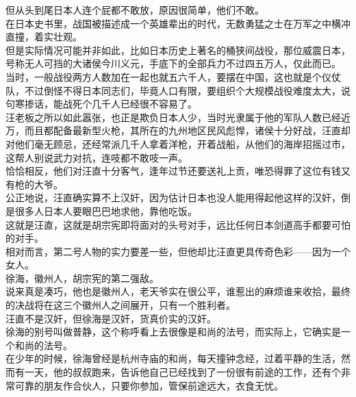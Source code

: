 \begin{multicols}{\theparacolNo}
但从头到尾日本人连个屁都不敢放，原因很简单，他们不敢。\\

在日本史书里，战国被描述成一个英雄辈出的时代，无数勇猛之士在万军之中横冲直撞，着实壮观。\\

但是实际情况可能并非如此，比如日本历史上著名的桶狭间战役，那位威震日本，号称无人可挡的大诸侯今川义元，手底下的全部兵力不过四五万人，仅此而已。\\

当时，一般战役两方人数加在一起也就五六千人，要摆在中国，这也就是个仪仗队，不过倒怪不得日本同志们，毕竟人口有限，要组织个大规模战役难度太大，说句寒掺话，能战死个几千人已经很不容易了。\\

汪老板之所以如此嚣张，也正是欺负日本人少，当时光隶属于他的军队人数已经近万，而且都配备最新型火枪，其所在的九州地区民风彪悍，诸侯十分好战，汪直却对他们毫无顾忌，还经常派几千人拿着洋枪，开着战船，从他们的海岸招摇过市，这帮人别说武力对抗，连吱都不敢吱一声。\\

恰恰相反，他们对汪直十分客气，逢年过节还要送礼上贡，唯恐得罪了这位有钱又有枪的大爷。\\

公正地说，汪直确实算不上汉奸，因为估计日本也没人能用得起他这样的汉奸，倒是很多人日本人要眼巴巴地求他，靠他吃饭。\\

这就是汪直，这就是胡宗宪即将面对的头号对手，远比任何日本剑道高手都要可怕的对手。\\

相对而言，第二号人物的实力要差一些，但他却比汪直更具传奇色彩——因为一个女人。\\

徐海，徽州人，胡宗宪的第二强敌。\\

说来真是凑巧，他也是徽州人，老天爷实在很公平，谁惹出的麻烦谁来收拾，最终的决战将在这三个徽州人之间展开，只有一个胜利者。\\

汪直不是汉奸，但徐海是汉奸，货真价实的汉奸。\\

徐海的别号叫做普静，这个称呼看上去很像是和尚的法号，而实际上，它确实是一个和尚的法号。\\

在少年的时候，徐海曾经是杭州寺庙的和尚，每天撞钟念经，过着平静的生活，然而有一天，他的叔叔跑来，告诉他自己已经找到了一份很有前途的工作，还有个非常可靠的朋友作合伙人，只要你参加，管保前途远大，衣食无忧。\\


\end{multicols}
